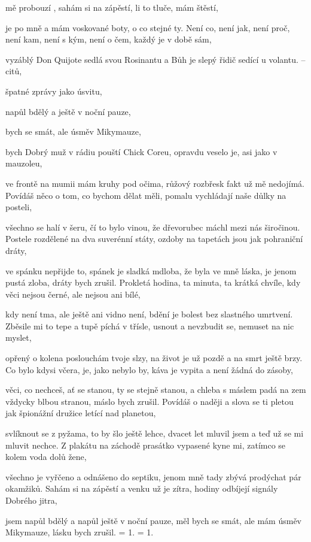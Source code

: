 
\zs
{} mě probouzí , sahám si na zápěs{tí},
li to  tluče,  mám  
štěstí,

 je po mně a  mám voskované bo{ty},
o co  stejné  ty. 
\ks
\zs
Není co, není jak, není proč, není kam,
není s kým, není o čem, každý je v době sám,

vyzáblý Don Quijote sedlá svou Rosinantu
a Bůh je slepý řidič sedící u volantu.
\ks
\zr
{}  --   citů,

špatné zprávy  jako   úsvitu,

 napůl bdělý a  ještě v noční pauze,

 bych se smát, ale  úsměv Mikymauze,

 bych    
\kr
\zs
Dobrý muž v rádiu pouští Chick Coreu,
opravdu veselo je, asi jako v mauzoleu,

ve frontě na mumii mám kruhy pod očima,
růžový rozbřesk fakt už mě nedojímá.
\ks
\zs
Povídáš něco o tom, co bychom dělat měli,
pomalu vychládají naše důlky na posteli,

všechno se halí v šeru, čí to bylo vinou,
že dřevorubec máchl mezi nás širočinou.
\ks
\zr
Postele rozdělené na dva suverénní státy,
ozdoby na tapetách jsou jak pohraniční dráty,

ve spánku nepřijde to, spánek je sladká mdloba,
že byla ve mně láska, je jenom pustá zloba,
dráty bych zrušil.
\kr
\zs
Prokletá hodina, ta minuta, ta krátká chvíle,
kdy věci nejsou černé, ale nejsou ani bílé,

kdy není tma, ale ještě ani vidno není,
bdění je bolest bez slastného umrtvení.
\ks
\zs
Zběsile mi to tepe a tupě píchá v třísle,
usnout a nevzbudit se, nemuset na nic myslet,

opřený o kolena poslouchám tvoje slzy,
na život je už pozdě a na smrt ještě brzy.
\ks
\zr
Co bylo kdysi včera, je, jako nebylo by,
káva je vypita a není žádná do zásoby,

věci, co nechceš, ať se stanou, ty se stejně stanou,
a chleba s máslem padá na zem vždycky blbou stranou,
máslo bych zrušil.
\kr
\zs
Povídáš o naději a slova se ti pletou
jak špionážní družice letící nad planetou,

svlíknout se z pyžama, to by šlo ještě lehce,
dvacet let mluvil jsem a teď už se mi mluvit nechce.
\ks
\zs
Z plakátu na záchodě prasátko vypasené
kyne mi, zatímco se kolem voda dolů žene,

všechno je vyřčeno a odnášeno do septiku,
jenom mně tady zbývá prodýchat pár okamžiků.
\ks
\zr
Sahám si na zápěstí a venku už je zítra,
hodiny odbíjejí signály Dobrého jitra,

jsem napůl bdělý a napůl ještě v noční pauze,
měl bych se smát, ale mám úsměv Mikymauze,
lásku bych zrušil.
\kr
\zs
= 1.
\ks
\zs
= 1.
\ks
\kp






